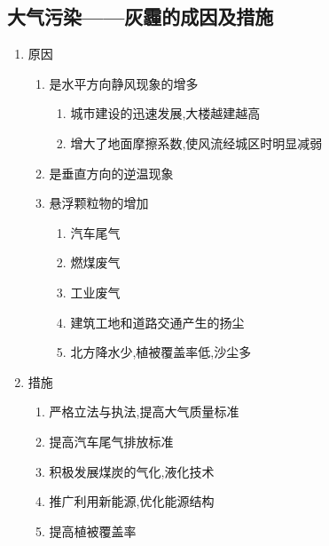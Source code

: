 \documentclass[a4paper]{article}
\begin{document}
    \subsection{大气污染——灰霾的成因及措施}
    \begin{enumerate}
        \item 原因
        \begin{enumerate}
            \item 是水平方向静风现象的增多
            \begin{enumerate}
                \item 城市建设的迅速发展,大楼越建越高
                \item 增大了地面摩擦系数,使风流经城区时明显减弱
            \end{enumerate}
            \item 是垂直方向的逆温现象
            \item 悬浮颗粒物的增加
            \begin{enumerate}
                \item 汽车尾气
                \item 燃煤废气
                \item 工业废气
                \item 建筑工地和道路交通产生的扬尘
                \item 北方降水少,植被覆盖率低,沙尘多
            \end{enumerate}
        \end{enumerate}
        \item 措施
        \begin{enumerate}
            \item 严格立法与执法,提高大气质量标准
            \item 提高汽车尾气排放标准
            \item 积极发展煤炭的气化,液化技术
            \item 推广利用新能源,优化能源结构
            \item 提高植被覆盖率
        \end{enumerate}
    \end{enumerate}
\end{document}
